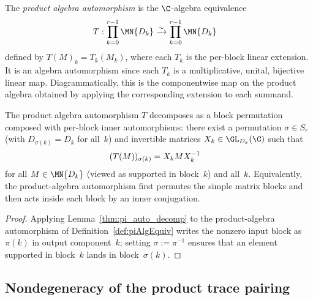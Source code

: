 \begin{definition}%
    \label{def:piAlgEquiv}
    \leanok
    The \emph{product algebra automorphism} is the $\C$-algebra
    equivalence
    \begin{align}
        T:\prod_{k=0}^{r-1} \MN{D_k}
         & \xrightarrow{\sim}
        \prod_{k=0}^{r-1} \MN{D_k}
        \notag
    \end{align}
    defined by $T(M)_k = T_k(M_k)$, where each $T_k$ is the per-block
    linear extension.
    It is an algebra automorphism since each $T_k$ is a multiplicative,
    unital, bijective linear map.
    Diagrammatically, this is the componentwise map on the product algebra
    obtained by applying the corresponding extension to each summand.
\end{definition}

\begin{lemma}%
    \label{thm:piAlgEquiv_decomposition}
    \leanok
    The product algebra automorphism $T$ decomposes as a block
    permutation composed with per-block inner automorphisms: there exist
    a permutation $\sigma \in S_r$ (with $D_{\sigma(k)} = D_k$ for
    all~$k$) and invertible matrices $X_k \in \GL_{D_k}(\C)$ such that
    \begin{align}
        (T(M))_{\sigma(k)}
         & =X_k M X_k^{-1}
        \notag
    \end{align}
    for all $M \in \MN{D_k}$ (viewed as supported in block~$k$) and
    all~$k$.
    Equivalently, the product-algebra automorphism first permutes the
    simple matrix blocks and then acts inside each block by an inner
    conjugation.
\end{lemma}

\begin{proof}\leanok{}
    Applying Lemma~\ref{thm:pi_auto_decomp} to the product-algebra
    automorphism of Definition~\ref{def:piAlgEquiv} writes the
    nonzero input block as $\pi(k)$ in output component~$k$; setting $\sigma := \pi^{-1}$ ensures that an element supported in block~$k$
    lands in block~$\sigma(k)$.
\end{proof}

\subsection{Nondegeneracy of the product trace pairing}

